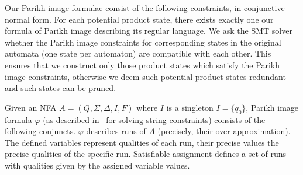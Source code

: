 Our Parikh image formulae consist of the following constraints, in conjunctive normal form. For each potential product state, there exists exactly one our formula of Parikh image describing its regular language. We ask the SMT solver whether the Parikh image constraints for corresponding states in the original automata (one state per automaton) are compatible with each other. This ensures that we construct only those product states which satisfy the Parikh image constraints, otherwise we deem such potential product states redundant and such states can be pruned.

Given an NFA $A = (Q, \Sigma, \Delta, I, F)$ where $I$ is a singleton $I = \{ q_{0} \}$, Parikh image formula $\varphi$ (as described in~\cite{PI_computation/10.1007/978-3-030-45093-9_59} for solving string constraints) consists of the following conjuncts. $\varphi$ describes runs of $A$ (precisely, their over-approximation). The defined variables represent qualities of each run, their precise values the precise qualities of the specific run. Satisfiable assignment defines a set of runs with qualities given by the assigned variable values.

